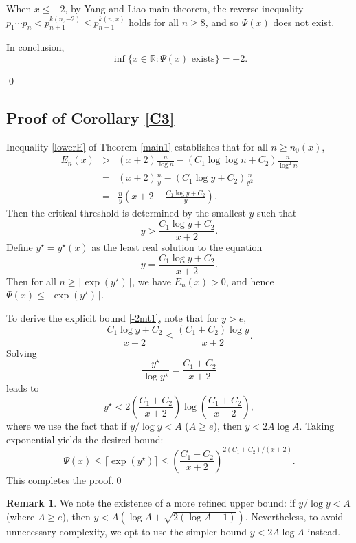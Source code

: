 \documentclass[10pt]{amsart}
\theoremstyle{definition} %
\newtheorem{remark}{Remark}[section]
\numberwithin{equation}{section}
\def\dfrac {\displaystyle\frac}
\def\dfrac {\displaystyle\frac}
\begin{document}
When \(x \leq -2\), by Yang and Liao \cite{bonse} main theorem, the reverse inequality \(p_1 \cdots p_n < p_{n+1}^{k(n,-2)}\leq p_{n+1}^{k(n,x)}\) holds for all $n\geq 8$, and so \(\Psi(x)\) does not exist.

In conclusion,
\[
\inf \{ x \in \mathbb{R} : \Psi(x) \text{ exists} \} = -2.
\]

\qed

\subsection{Proof of Corollary \ref{C3}}

Inequality \eqref{lowerE} of Theorem \ref{main1} establishes that for all \( n \geq n_0(x) \),
\begin{eqnarray*}
  E_n(x) & > &  (x+2)\frac{n}{\log n} - (C_1\log \log n + C_2) \frac{n}{\log^2 n}\\
  & = & (x+2)\frac{n}{y} - (C_1\log y + C_2) \frac{n}{y^2}\\
  & = & \frac{n}{y}\left(x+2-\dfrac{C_1\log y + C_2}{y}\right).  
\end{eqnarray*}
Then the critical threshold is determined by the smallest \( y \) such that
\[
y > \frac{C_1 \log y + C_2}{x+2}.
\]
Define \( y^\star = y^\star(x) \) as the least real solution to the equation
\[
y = \frac{C_1 \log y + C_2}{x+2}.
\]
Then for all \( n \geq \lceil \exp(y^\star) \rceil \), we have \( E_n(x) > 0 \), and hence \( \Psi(x) \leq \lceil \exp(y^\star) \rceil \).

To derive the explicit bound \eqref{-2mt1}, note that for \( y > e \),
\[
\frac{C_1 \log y + C_2}{x+2} \leq \frac{(C_1 + C_2) \log y}{x+2}.
\]
Solving
\[
\dfrac{y^{\star}}{\log y^{\star}}=\frac{C_1 + C_2}{x+2}
\]
leads to
\[
y^{\star} < 2\left( \frac{C_1 + C_2}{x+2} \right)\log \left( \frac{C_1 + C_2}{x+2} \right),
\]
where we use the fact that if \( y / \log y<A\) ($A\geq e$), then  $y<2A\log A$. Taking exponential yields the desired bound:
\[
\Psi(x) \leq \lceil \exp(y^{\star})\rceil \leq  \left( \frac{C_1 + C_2}{x+2} \right)^{2(C_1 + C_2)/(x+2)}.
\]
This completes the proof.\qed

\begin{remark}
We note the existence of a more refined upper bound: if $ y / \log y < A $ (where $ A \geq e $), then $ y < A (\log A + \sqrt{2 (\log A - 1)}) $. Nevertheless, to avoid unnecessary complexity, we opt to use the simpler bound $ y < 2A \log A $ instead.
\end{remark}
\end{document}
